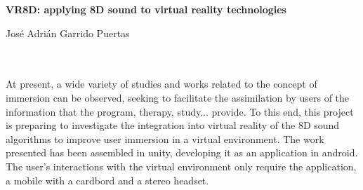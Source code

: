 \thispagestyle{empty}

\begin{center}
	{\large\bfseries VR8D: applying 8D sound to virtual reality technologies }\\
\end{center}

\begin{center}
	José Adrián Garrido Puertas\\
\end{center}

\begin{flushleft}
	\\
	
	\vspace{0.7cm}
	\\
	At present, a wide variety of studies and works related to the concept of immersion can be observed, seeking to facilitate the assimilation by users of the information that the program, therapy, study... provide.
	To this end, this project is preparing to investigate the integration into virtual reality of the 8D sound algorithms to improve user immersion in a virtual environment.
	The work presented has been assembled in unity, developing it as an application in android.
	The user's interactions with the virtual environment only require the application, a mobile with a cardbord and a stereo headset.
\end{flushleft}

\newpage %

